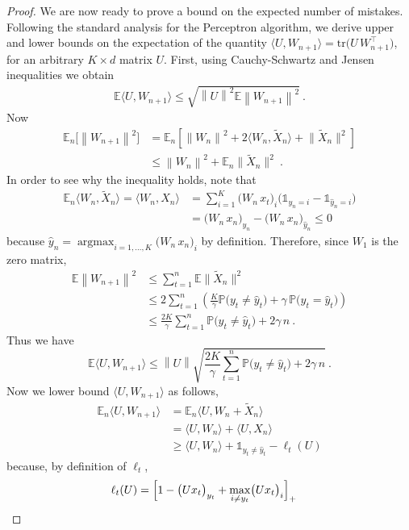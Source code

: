 \documentclass[11pt]{hackednow}
\renewcommand{\P}{\mathbb{P}}
\newcommand{\E}{\mathbb{E}}
\def\ds1{\mathds{1}}
\newcommand{\wh}{\widehat}
\newcommand{\argmax}{\mathop{\mathrm{argmax}}}
\newcommand{\inner}[2]{\bigl\langle{#1},{#2}\bigr\rangle}
\newcommand{\norm}[1]{\left\|{#1}\right\|}
\newcommand{\yhat}{\wh{y}}
\newcommand{\tX}{\widetilde{X}}
\begin{document}
\begin{proof}
We are now ready to prove a bound on the expected number of mistakes. Following the standard analysis for the Perceptron algorithm, we derive upper and lower bounds on the expectation of the quantity $\inner{U}{W_{n+1}} = \mathrm{tr}\bigl(U\,W_{n+1}^{\top}\bigr)$, for an arbitrary $K \times d$ matrix $U$.
First, using Cauchy-Schwartz and Jensen inequalities we obtain
\begin{align*}
    \E\inner{U}{W_{n+1}}
\le
    \sqrt{\norm{U}^2\E\norm{W_{n+1}}^2}~.
\end{align*}
Now
\begin{align*}
    \E_n\bigl[\norm{W_{n+1}}^2\bigr]
&=
    \E_n\left[\norm{W_n}^2 + 2\inner{W_n}{\tX_n} + \bigl\|\tX_n\bigr\|^2\right]
\\ &\le
    \norm{W_n}^2 + \E_n\bigl\|\tX_n\bigr\|^2~.
\end{align*}
In order to see why the inequality holds, note that
\begin{align*}
    \E_n\inner{W_n}{\tX_n}
=
    \inner{W_n}{X_n}
&=
    \sum_{i=1}^K \bigl(W_n\,x_t\bigr)_i \bigl(\ds1_{y_n=i} - \ds1_{\yhat_n=i}\bigr)
\\ &=
    \bigl(W_n\,x_n\bigr)_{y_n} - \bigl(W_n\,x_n\bigr)_{\yhat_n} \le 0
\end{align*}
because $\yhat_n = \argmax_{i=1,\dots,K} \bigl(W_n\,x_n\bigr)_i$ by definition.
Therefore, since $W_1$ is the zero matrix,
\begin{align*}
    \E\norm{W_{n+1}}^2
&\le
    \sum_{t=1}^n \E\bigl\|\tX_n\bigr\|^2
\\ &\le
    2\sum_{t=1}^n \left(\frac{K}{\gamma}\P\bigl(y_t \neq \yhat_t\bigr) + \gamma\,\P\bigl(y_t = \yhat_t\bigr)\right)
\\ &\le
\frac{2K}{\gamma}\sum_{t=1}^n \P\bigl(y_t \neq \yhat_t\bigr) + 2\gamma\,n~.
\end{align*}
Thus we have
\[
    \E\inner{U}{W_{n+1}} \le \norm{U}\sqrt{\frac{2K}{\gamma}\sum_{t=1}^n \P\bigl(y_t \neq \yhat_t\bigr) + 2\gamma\,n}~.
\]
Now we lower bound $\inner{U}{W_{n+1}}$ as follows,
\begin{align*}
    \E_n\inner{U}{W_{n+1}}
&=
    \E_n\inner{U}{W_n + \tX_n}
\\ &=
    \inner{U}{W_n} + \inner{U}{X_n}
\\ &\ge
    \inner{U}{W_n} + \ds1_{y_t \neq \yhat_t} - \ell_t(U)
\end{align*}
because, by definition of $\ell_t$,
\begin{align*}
    \ell_t(U)
&=
    \Bigl[1 - \bigl(Ux_t\bigr)_{y_t} + \max_{i \neq y_t}\bigl(Ux_t\bigr)_i \Bigr]_+

\end{align*}
\end{proof}
\end{document}
